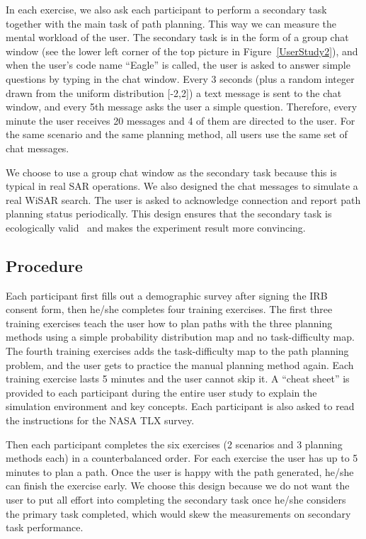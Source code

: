 In each exercise, we also ask each participant to perform a secondary task together with the main task of path planning. This way we can measure the mental workload of the user. The secondary task is in the form of a group chat window (see the lower left corner of the top picture in Figure~\ref{UserStudy2}), and when the user's code name ``Eagle'' is called, the user is asked to answer simple questions by typing in the chat window. Every 3 seconds (plus a random integer drawn from the uniform distribution [-2,2]) a text message is sent to the chat window, and every 5th message asks the user a simple question. Therefore, every minute the user receives 20 messages and 4 of them are directed to the user. For the same scenario and the same planning method, all users use the same set of chat messages.

We choose to use a group chat window as the secondary task because this is typical in real SAR operations. We also designed the chat messages to simulate a real WiSAR search. The user is asked to acknowledge connection and report path planning status periodically. This design ensures that the secondary task is ecologically valid~\cite{Vicente1997Should,Rasmussen1994Cognitive} and makes the experiment result more convincing.

\subsection{Procedure}

Each participant first fills out a demographic survey after signing the IRB consent form, then he/she completes four training exercises. The first three training exercises teach the user how to plan paths with the three planning methods using a simple probability distribution map and no task-difficulty map. The fourth training exercises adds the task-difficulty map to the path planning problem, and the user gets to practice the manual planning method again. Each training exercise lasts 5 minutes and the user cannot skip it. A ``cheat sheet'' is provided to each participant during the entire user study to explain the simulation environment and key concepts. Each participant is also asked to read the instructions for the NASA TLX survey.

Then each participant completes the six exercises (2 scenarios and 3 planning methods each) in a counterbalanced order. For each exercise the user has up to 5 minutes to plan a path. Once the user is happy with the path generated, he/she can finish the exercise early. We choose this design because we do not want the user to put all effort into completing the secondary task once he/she considers the primary task completed, which would skew the measurements on secondary task performance.


